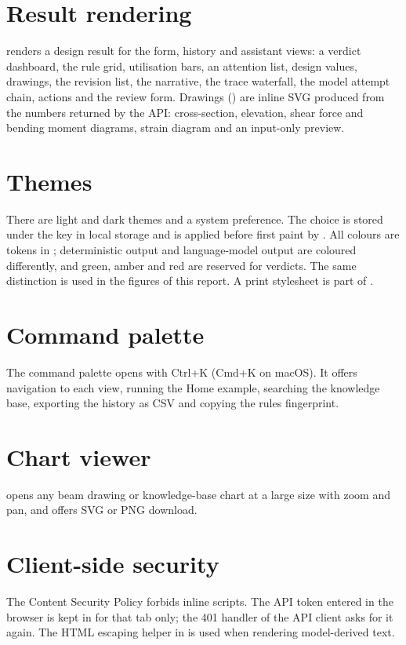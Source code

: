 \section{Result rendering}
 renders a design result for the form, history and assistant views: a verdict dashboard, the rule grid, utilisation bars, an attention list, design values, drawings, the revision list, the narrative, the trace waterfall, the model attempt chain, actions and the review form. Drawings () are inline SVG produced from the numbers returned by the API: cross-section, elevation, shear force and bending moment diagrams, strain diagram and an input-only preview.

\section{Themes}
There are light and dark themes and a system preference. The choice is stored under the key  in local storage and is applied before first paint by . All colours are tokens in ; deterministic output and language-model output are coloured differently, and green, amber and red are reserved for verdicts. The same distinction is used in the figures of this report. A print stylesheet is part of .

\section{Command palette}
The command palette opens with Ctrl+K (Cmd+K on macOS). It offers navigation to each view, running the Home example, searching the knowledge base, exporting the history as CSV and copying the rules fingerprint.

\section{Chart viewer}
 opens any beam drawing or knowledge-base chart at a large size with zoom and pan, and offers SVG or PNG download.

\section{Client-side security}
The Content Security Policy forbids inline scripts. The API token entered in the browser is kept in  for that tab only; the 401 handler of the API client asks for it again. The HTML escaping helper in  is used when rendering model-derived text.

